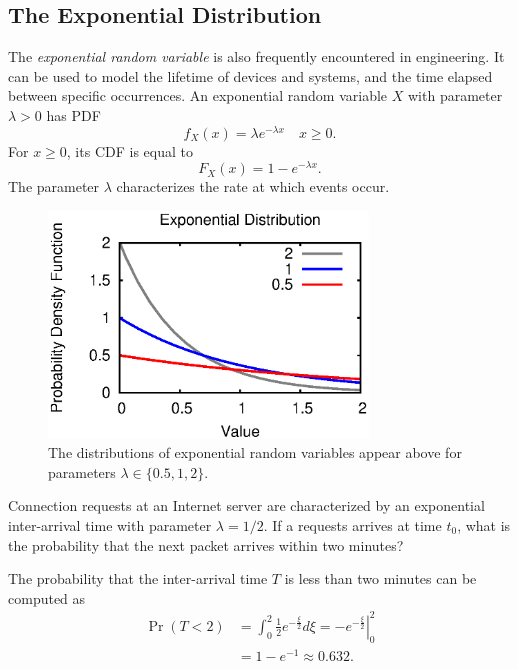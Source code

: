 \subsection{The Exponential Distribution}

The \emph{exponential random variable} is also frequently encountered in engineering. 
It can be used to model the lifetime of devices and systems, and the time elapsed between specific occurrences.
An exponential random variable $X$ with parameter $\lambda > 0$ has PDF
\begin{equation*}
f_X (x) = \lambda e^{- \lambda x} \quad x \geq 0.
\end{equation*}
For $x \geq 0$, its CDF is equal to
\begin{equation*}
F_X (x) = 1 - e^{- \lambda x} .
\end{equation*}
The parameter $\lambda$ characterizes the rate at  which events occur.

\begin{figure}[ht]
\begin{center}
\includegraphics[width=8.5cm]{Figures/8chapter/exponential_pdf}
\end{center}
\caption{The distributions of exponential random variables appear above for parameters $\lambda \in \{0.5, 1, 2 \}$.}
\end{figure}

\begin{example}
Connection requests at an Internet server are characterized by an exponential inter-arrival time with parameter $\lambda = 1/2$.
If a requests arrives at time $t_0$, what is the probability that the next packet arrives within two minutes?

The probability that the inter-arrival time $T$ is less than two minutes can be computed as
\begin{equation*}
\begin{split}
\Pr ( T < 2 ) &= \int_0^2 \frac{1}{2} e^{- \frac{\xi}{2}} d\xi
= \left. - e^{- \frac{\xi}{2}} \right|_0^2 \\
&= 1 - e^{-1} \approx 0.632 .
\end{split}
\end{equation*}
\end{example}

